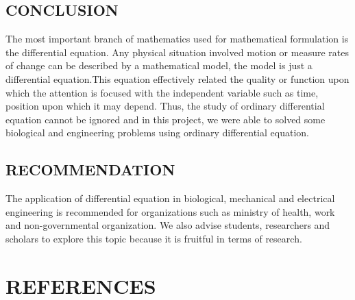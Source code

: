 \documentclass[11pt]{report}
\begin{document}
	\section{CONCLUSION}
	The most important branch of mathematics used for mathematical formulation is the differential equation.  Any physical situation involved motion or measure rates of change can be described by a mathematical model, the model is just a differential equation.This equation effectively related the quality or function upon which the attention is focused with the independent variable such as time, position upon which it may depend. Thus, the study of ordinary differential equation cannot be ignored and in this project, we were able to solved some biological and engineering problems using ordinary differential equation.\\
	
	
	\section{RECOMMENDATION}
	The application of differential equation in biological, mechanical and electrical engineering is recommended for organizations such as ministry of health, work and non-governmental organization. We also advise students, researchers and scholars to explore this topic because it is fruitful in terms of research.  
	
	
	\chapter*{REFERENCES}
	
\end{document}
